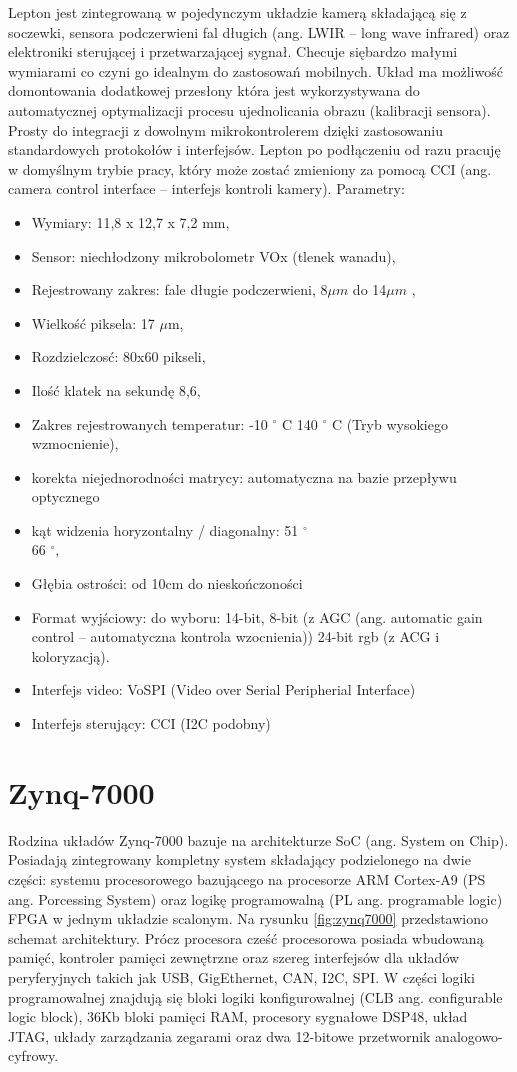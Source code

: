 Lepton jest zintegrowaną w pojedynczym układzie kamerą składającą się z soczewki, sensora podczerwieni fal długich (ang. LWIR – long wave infrared) oraz elektroniki sterującej i przetwarzającej sygnał. Checuje siębardzo małymi wymiarami co czyni go idealnym do zastosowań mobilnych. Układ ma możliwość domontowania dodatkowej przesłony która jest wykorzystywana do automatycznej optymalizacji procesu ujednolicania obrazu (kalibracji sensora).
Prosty do integracji z dowolnym mikrokontrolerem dzięki zastosowaniu standardowych protokołów i interfejsów. Lepton po podłączeniu od razu pracuję w domyślnym trybie pracy, który może zostać zmieniony za pomocą CCI (ang. camera control interface – interfejs kontroli kamery).\cite{lepton}
Parametry:
\begin{itemize}
\item Wymiary: 11,8 x 12,7 x 7,2 mm, 
\item Sensor: niechłodzony mikrobolometr VOx (tlenek wanadu),
\item Rejestrowany zakres: fale długie podczerwieni, 8$\mu m$ do 14$\mu m$ ,
\item Wielkość piksela: 17 $\mu$m,
\item Rozdzielczosć: 80x60 pikseli,
\item Ilość klatek na sekundę 8,6,
\item Zakres rejestrowanych temperatur: -10  $^\circ$  C 140  $^\circ$  C (Tryb wysokiego wzmocnienie),
\item korekta niejednorodności matrycy: automatyczna na bazie przepływu optycznego
\item kąt widzenia horyzontalny / diagonalny: 51 $^\circ$ \\ 66 $^\circ$,
\item Głębia ostrości: od 10cm do nieskończoności
\item Format wyjściowy: do wyboru: 14-bit, 8-bit (z AGC (ang. automatic gain control – automatyczna kontrola wzocnienia)) 24-bit rgb (z ACG i koloryzacją).
\item Interfejs video: VoSPI (Video over Serial Peripherial Interface)
\item Interfejs sterujący: CCI (I2C podobny)
\end{itemize}
\section{Zynq-7000}

Rodzina układów Zynq-7000 bazuje na architekturze SoC (ang. System on Chip). Posiadają zintegrowany kompletny system składający podzielonego na dwie części: systemu procesorowego bazującego na procesorze ARM Cortex-A9 (PS ang. Porcessing System) oraz logikę programowalną (PL ang. programable logic) FPGA w jednym układzie scalonym. Na rysunku \ref{fig:zynq7000} przedstawiono schemat architektury. Prócz procesora cześć procesorowa posiada wbudowaną pamięć, kontroler pamięci zewnętrzne oraz szereg interfejsów dla układów peryferyjnych takich jak USB, GigEthernet, CAN, I2C, SPI. W części logiki programowalnej znajdują się bloki logiki konfigurowalnej (CLB ang. configurable logic block), 36Kb bloki pamięci RAM, procesory sygnałowe DSP48, układ JTAG, układy zarządzania zegarami oraz dwa 12-bitowe przetwornik analogowo-cyfrowy.

